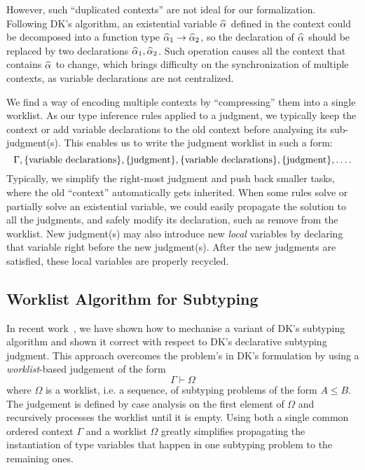 However, such ``duplicated contexts'' are not ideal for our formalization.
Following DK's algorithm, an existential variable $\al$ defined in the context
could be decomposed into a function type $\al[1] \to \al[2]$,
so the declaration of $\al$ should be replaced by two declarations $\al[1], \al[2]$.
Such operation causes all the context that contains $\al$ to change,
which brings difficulty on the synchronization of multiple contexts,
as variable declarations are not centralized.

We find a way of encoding multiple contexts by ``compressing'' them into a single worklist.
As our type inference rules applied to a judgment,
we typically keep the context or add variable declarations to the old context
before analysing its sub-judgment(s).
This enables us to write the judgment worklist in such a form:
$$\Gamma, \{\text{variable declarations}\}, \{\text{judgment}\},
\{\text{variable declarations}\}, \{\text{judgment}\}, \ldots .$$
Typically, we simplify the right-most judgment and push back smaller tasks,
where the old ``context'' automatically gets inherited.
When some rules solve or partially solve an existential variable,
we could easily propagate the solution to all the judgments,
and safely modify its declaration, such as remove from the worklist.
New judgment(s) may also introduce new \emph{local} variables by declaring
that variable right before the new judgment(s).
After the new judgments are satisfied, these local variables are properly recycled.


\subsection{Worklist Algorithm for Subtyping}

In recent work~\cite{itp2018}, we have shown how to mechanise a variant of DK's
subtyping algorithm and shown it correct with respect to DK's declarative
subtyping judgment. This approach overcomes the problem's in DK's formulation
by using a \emph{worklist}-based judgement of the form $$\Gamma \vdash \Omega$$
where $\Omega$ is a worklist, i.e. a sequence, of subtyping problems of the
form $A \leq B$.  The judgement is defined by case analysis on the first
element of $\Omega$ and recursively processes the worklist until it is empty.
Using both a single common ordered context $\Gamma$ and a worklist $\Omega$ greatly
simplifies propagating the instantiation of type variables that happen in one
subtyping problem to the remaining ones.


